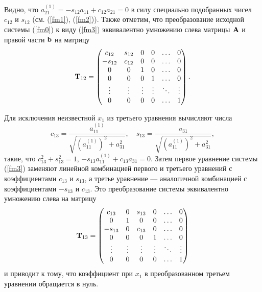 \documentclass[12pt]{article}
\begin{document}
	Видно, что $a_{21}^{\left(1\right)}=-s_{12}a_{11}+c_{12}a_{21}=0$ в силу специально подобранных чисел $c_{12}$ и $s_{12}$ (см. (\ref{fm1}), (\ref{fm2})). Также отметим, что преобразование исходной системы (\ref{fm0}) к виду (\ref{fm3}) эквивалентно умножению слева матрицы $\bold{A}$ и правой части $\bold{b}$ на матрицу
	\begin{equation}
		\bold{T}_{12}=\begin{pmatrix}
			c_{12} & s_{12} & 0 & 0 & \ldots & 0 \\
			-s_{12} & c_{12} & 0 & 0 & \ldots & 0 \\
			0 & 0 & 1 & 0 & \ldots & 0 \\
			0 & 0 & 0 & 1 & \ldots & 0 \\
			\vdots & \vdots & \vdots & \vdots & \ddots & \vdots \\
			0 & 0 & 0 & 0 & \ldots & 1 \\
		\end{pmatrix}.
	\end{equation}
	
	Для исключения неизвестной $x_1$ из третьего уравнения вычисляют числа
	\begin{equation}
		c_{13}=\frac{a_{11}^{\left(1\right)}}{\sqrt{\left(a_{11}^{\left(1\right)}\right)^2+a_{31}^2}},\quad s_{13}=\frac{a_{31}}{\sqrt{\left(a_{11}^{\left(1\right)}\right)^2+a_{31}^2}},
	\end{equation}
	такие, что $c_{13}^{2}+s_{13}^2=1$, $-s_{13}a_{11}^{\left(1\right)}+c_{13}a_{31}=0$. Затем первое уравнение системы (\ref{fm3}) заменяют линейной комбинацией первого и третьего уравнений с коэффициентами $c_{13}$ и $s_{13}$, а третье уравнение --- аналогичной комбинацией с коэффициентами $-s_{13}$ и $c_{13}$. Это преобразование системы эквивалентно умножению слева на матрицу
	\begin{equation}
			\bold{T}_{13}=\begin{pmatrix}
			c_{13} & 0 & s_{13} & 0 & \ldots & 0 \\
			0 & 1 & 0 & 0 & \ldots & 0 \\
			-s_{13} &0 &  c_{13} & 0 & \ldots & 0 \\
			0 & 0 & 0 & 1 & \ldots & 0 \\
			\vdots & \vdots & \vdots & \vdots & \ddots & \vdots \\
			0 & 0 & 0 & 0 & \ldots & 1 \\
		\end{pmatrix}
	\end{equation}
	и приводит к тому, что коэффициент при $x_1$ в преобразованном третьем уравнении обращается в нуль.
	
\end{document}
